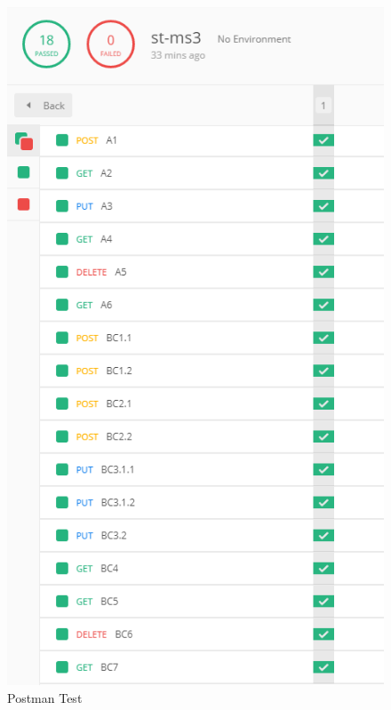 \begin{figure}[H]
  \begin{center}
    \includegraphics{ms3/static/postman_test.PNG}
  \end{center}
  \caption{Postman Test}
\end{figure}

